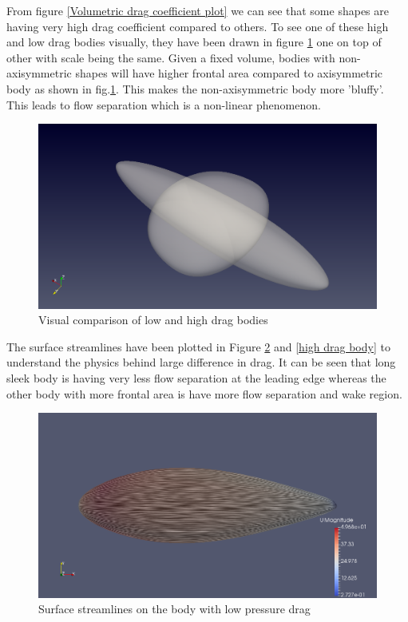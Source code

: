 From figure \ref{Volumetric drag coefficient plot} we can see that some shapes are having very high drag coefficient compared to others. To see one of these high and low drag bodies visually, they have been drawn in figure \ref{visual comparison} one on top of other with scale being the same. Given a fixed volume, bodies with non-axisymmetric shapes will have higher frontal area compared to axisymmetric body as shown in fig.\ref{visual comparison}. This makes the non-axisymmetric body more 'bluffy'. This leads to flow separation which is a non-linear phenomenon.

\begin{figure}[H]
	\centering
	\includegraphics[width=300 pt]{rnd/visual_low_high.png}
	\caption{Visual comparison of low and high drag bodies}
	\label{visual comparison} %
\end{figure}

The surface streamlines have been plotted in Figure \ref{low drag body} and \ref{high drag body} to understand the physics behind large difference in drag. It can be seen that long sleek body is having very less flow separation at the leading edge whereas the other body with more frontal area is have more flow separation and wake region.

\begin{figure}[H]
	\centering
	\includegraphics[width=300 pt]{rnd/streamlines_25_l.png}
	\caption{Surface streamlines on the body with low pressure drag}
	\label{low drag body} %
\end{figure}

